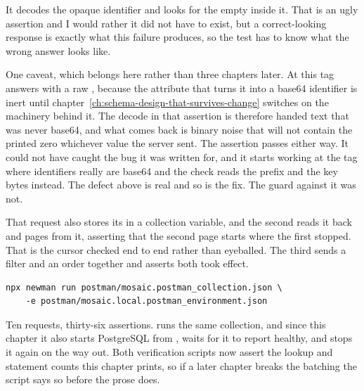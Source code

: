 It decodes the opaque identifier and looks for the empty  inside it.
That is an ugly assertion and I would rather it did not have to exist, but a
correct-looking response is exactly what this failure produces, so the test has
to know what the wrong answer looks like.

One caveat, which belongs here rather than three chapters later. At this tag
 answers with a raw , because the attribute that
turns it into a base64 identifier is inert until
chapter~\ref{ch:schema-design-that-survives-change} switches on the machinery
behind it. The decode in that assertion is therefore handed text that was never
base64, and what comes back is binary noise that will not contain the printed
zero  whichever value the server sent. The assertion passes either
way. It could not have caught the bug it was written for, and it starts working
at the tag where identifiers really are base64 and the check reads the prefix
and the key bytes instead. The defect above is real and so is the fix. The
guard against it was not.

That request also stores its  in a collection variable, and the
second reads it back and pages from it, asserting that the second page starts
where the first stopped. That is the cursor checked end to end rather than
eyeballed. The third sends a filter and an order together and asserts both took
effect.

\begin{verbatim}
npx newman run postman/mosaic.postman_collection.json \
    -e postman/mosaic.local.postman_environment.json
\end{verbatim}

Ten requests, thirty-six assertions.  runs the same
collection, and since this chapter it also starts PostgreSQL from
\code{docker-compose.yml}, waits for it to report healthy, and stops it again on
the way out. Both verification scripts now assert the lookup and statement
counts this chapter prints, so if a later chapter breaks the batching the script
says so before the prose does.
